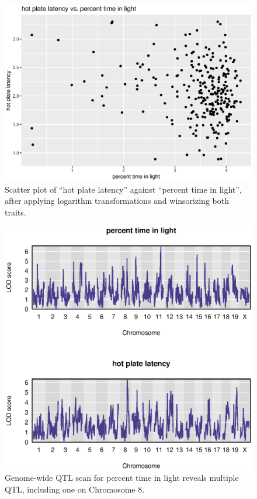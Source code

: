 \documentclass[12pt,twoside, lineno]{gsajnl}
\begin{document}
\clearpage


\renewcommand{\thefigure}{\textbf{S\arabic{figure}}}
\setcounter{figure}{0}

\begin{figure}
\includegraphics[width = \textwidth]{../Rmd/scatter.eps}
\caption{Scatter plot of ``hot plate latency'' against ``percent time in
  light'', after applying logarithm transformations and winsorizing
  both traits.}
\label{fig:scatter}
\end{figure}


\begin{figure}
\includegraphics{../Rmd/genomewide_lods_10-22.eps}
\caption{Genome-wide QTL scan for percent time in light reveals
  multiple QTL, including one on Chromosome 8.}
\label{fig:genomewide10-22}
\end{figure}
\end{document}
